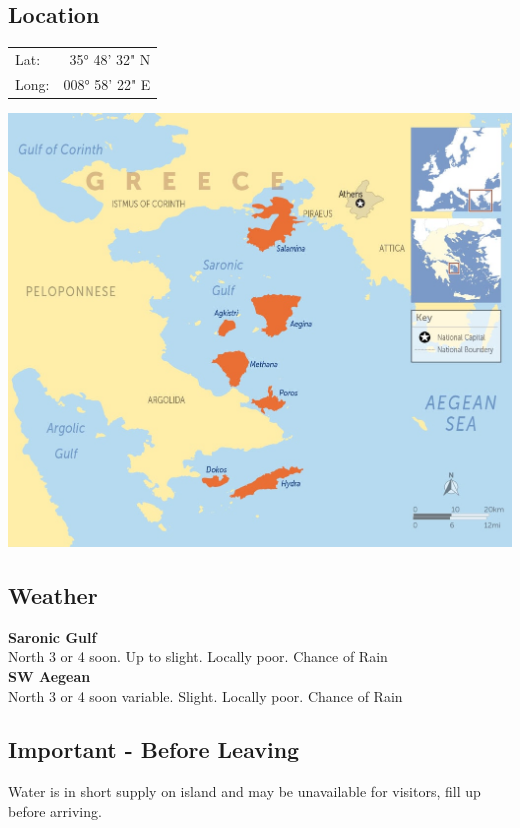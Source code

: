 \documentclass[12pt,a4paper,oneside]{article}
\begin{document}
\begin{multicols}{2}

\subsection*{Location}
\begin{tabular}{l|r}
Lat: & 35° 48' 32" N \\  
Long: & 008° 58' 22" E \\ 
\end{tabular} 

\noindent \includegraphics[scale=0.25]{saronic-map.jpg} 

\subsection*{Weather}
\noindent \textbf{Saronic Gulf}\\
North 3 or 4 soon. Up to slight. Locally poor. Chance of Rain\\

\noindent \textbf{SW Aegean}\\
North 3 or 4 soon variable. Slight. Locally poor. Chance of Rain\\

\subsection*{Important - Before Leaving}

Water is in short supply on island and may be unavailable for visitors, fill up before arriving.


\end{multicols}
\end{document}
